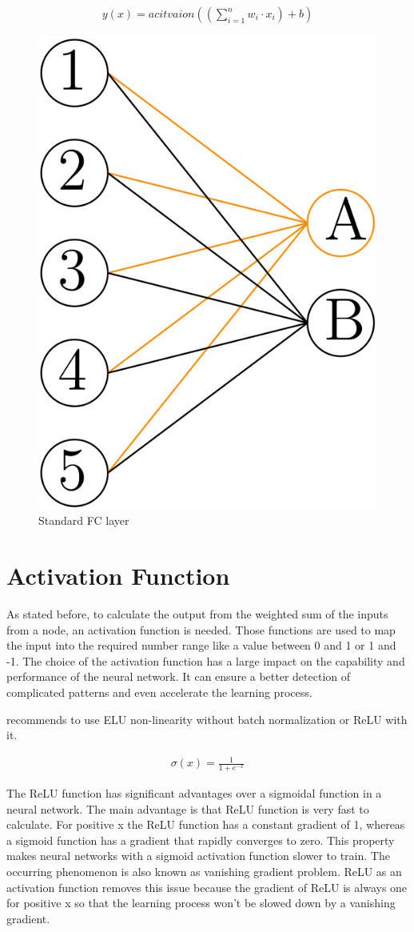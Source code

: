 \documentclass[
a4paper, 
12pt,
grayscalebody, %
abstract=on,
twoside, BCOR10mm, 12pt, DIV13,headinclude, footexclude, final, abstracton, openright
]{ibireprt}
\numberwithin{equation}{chapter}
\numberwithin{table}{chapter}
\numberwithin{figure}{chapter}
\numberwithin{algorithm}{chapter}
\numberwithin{example}{chapter}
\numberwithin{example}{chapter}
\begin{document}
\begin{align}
	y(x)=acitvaion((\sum_{i=1}^{n}w_i\cdot x_i)+b)
\end{align}

\begin{figure}[h]
	\centering
	\includegraphics[width =0.25 \textwidth]{Dense_layer.png}%
	\caption{Standard FC layer}
	\label{fig:fig_fc_layer}
\end{figure}



\section{Activation Function}
As stated before, to calculate the output from the weighted sum of the inputs from a node, an activation function is needed. Those functions are used to map the input into the required number range like a value between 0 and 1 or 1 and -1. The choice of the activation function has a large impact on the capability and performance of the neural network. It can ensure a better detection of complicated patterns and even accelerate the learning process. \cite{Khan2020} 

\cite{Mishkin2017} recommends to use ELU non-linearity without batch normalization or ReLU with it.

\begin{align}
	\sigma (x)= \frac{1}{1+e^{-x}}
\end{align}

The ReLU function has significant advantages over a sigmoidal function in a neural network. The main advantage is that ReLU function is very fast to calculate. For positive x the ReLU function has a constant gradient of 1, whereas a sigmoid function has a gradient that rapidly converges to zero. This property makes neural networks with a sigmoid activation function slower to train. The occurring phenomenon is also known as vanishing gradient problem. %
ReLU as an activation function removes this issue because the gradient of ReLU is always one for positive x so that the learning process won't be slowed down by a vanishing gradient. 
\end{document}
